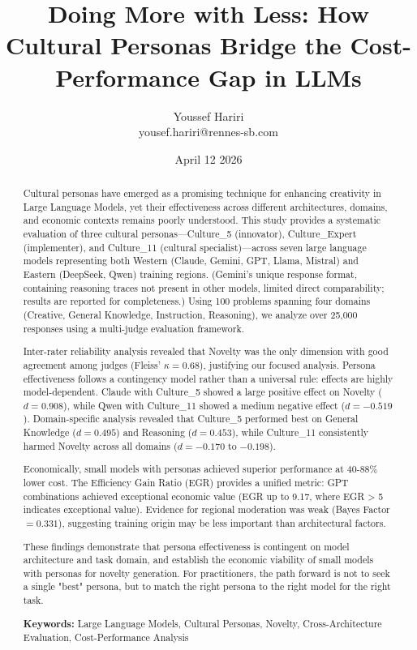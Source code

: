 \documentclass{article}
\begin{document}
\title{Doing More with Less: How Cultural Personas Bridge the Cost-Performance Gap in LLMs}
\author{Youssef Hariri \\ yousef.hariri@rennes-sb.com}
\date{April 12 2026}
\maketitle


\begin{abstract}

Cultural personas have emerged as a promising technique for enhancing creativity in Large Language Models, yet their effectiveness across different architectures, domains, and economic contexts remains poorly understood. This study provides a systematic evaluation of three cultural personas—Culture\_5 (innovator), Culture\_Expert (implementer), and Culture\_11 (cultural specialist)—across seven large language models representing both Western (Claude, Gemini, GPT, Llama, Mistral) and Eastern (DeepSeek, Qwen) training regions. (Gemini's unique response format, containing reasoning traces not present in other models, limited direct comparability; results are reported for completeness.) Using 100 problems spanning four domains (Creative, General Knowledge, Instruction, Reasoning), we analyze over 25,000 responses using a multi-judge evaluation framework.

Inter-rater reliability analysis revealed that Novelty was the only dimension with good agreement among judges (Fleiss' \(\kappa = 0.68\)), justifying our focused analysis. Persona effectiveness follows a contingency model rather than a universal rule: effects are highly model-dependent. Claude with Culture\_5 showed a large positive effect on Novelty (\(d = 0.908\)), while Qwen with Culture\_11 showed a medium negative effect (\(d = -0.519\)). Domain-specific analysis revealed that Culture\_5 performed best on General Knowledge (\(d = 0.495\)) and Reasoning (\(d = 0.453\)), while Culture\_11 consistently harmed Novelty across all domains (\(d = -0.170\) to \(-0.198\)).

Economically, small models with personas achieved superior performance at 40-88\% lower cost. The Efficiency Gain Ratio (EGR) provides a unified metric: GPT combinations achieved exceptional economic value (EGR up to 9.17, where EGR > 5 indicates exceptional value). Evidence for regional moderation was weak (Bayes Factor \(= 0.331\)), suggesting training origin may be less important than architectural factors.

These findings demonstrate that persona effectiveness is contingent on model architecture and task domain, and establish the economic viability of small models with personas for novelty generation. For practitioners, the path forward is not to seek a single "best" persona, but to match the right persona to the right model for the right task.

\textbf{Keywords:} Large Language Models, Cultural Personas, Novelty, Cross-Architecture Evaluation, Cost-Performance Analysis
\end{abstract}
\end{document}
